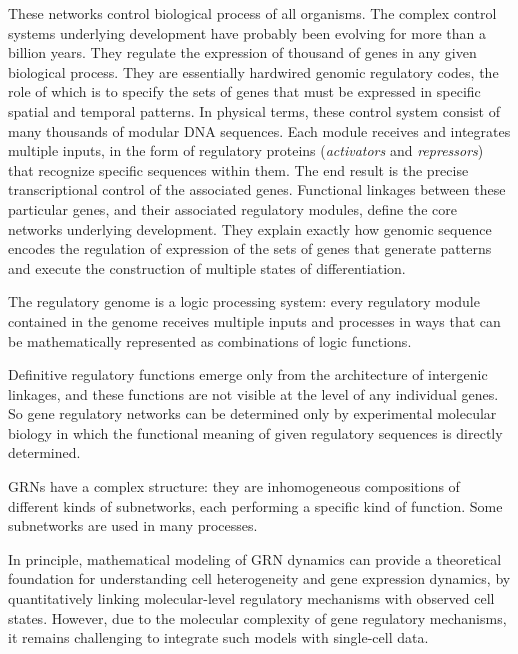 These networks control biological process of all organisms. The complex control systems underlying development have probably been evolving for more than a billion years. They regulate the expression of thousand of genes in any given biological process. They are essentially hardwired genomic regulatory codes, the role of which is to specify the sets of genes that must be expressed in specific spatial and temporal patterns. In physical terms, these control system consist of many thousands of modular DNA sequences. Each module receives and integrates multiple inputs, in the form of regulatory proteins (\emph{activators} and \emph{repressors}) that recognize specific sequences within them. The end result is the precise transcriptional control of the associated genes. 
Functional linkages between these particular genes, and their associated regulatory modules, define the core networks underlying development. They explain exactly how genomic sequence encodes the regulation of expression of the sets of genes that generate patterns and execute the construction of multiple states of differentiation.

The regulatory genome is a logic processing system: every regulatory module contained in the genome receives multiple inputs and processes in ways that can be mathematically represented as combinations of logic functions. 

Definitive regulatory functions emerge only from the architecture of intergenic linkages, and these functions are not visible at the level of any individual genes. So gene regulatory networks can be determined only by experimental molecular biology in which the functional meaning of given regulatory sequences is directly determined.

GRNs have a complex structure: they are inhomogeneous compositions of different kinds of subnetworks, each performing a specific kind of function. Some subnetworks are used in many processes.

In principle, mathematical modeling of GRN dynamics can provide a theoretical foundation for understanding cell heterogeneity and gene expression dynamics, by quantitatively linking molecular-level regulatory mechanisms with observed cell states. However, due to the molecular complexity of gene regulatory mechanisms, it remains challenging to integrate such models with single-cell data.

